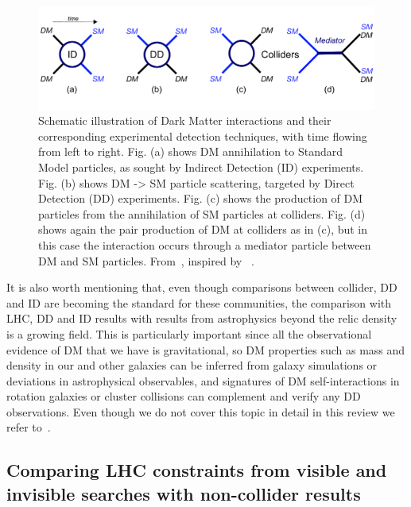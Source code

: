 \begin{figure}[!htpb]
\includegraphics[width=\textwidth]{figures/EFTSimplifiedModels}
\caption{Schematic illustration of Dark Matter interactions and their corresponding experimental detection techniques, with time flowing from left to right. Fig. (a) shows DM annihilation to Standard Model particles, as sought by Indirect Detection (ID) experiments. Fig. (b) shows DM -> SM particle scattering, targeted by Direct Detection (DD) experiments. Fig. (c) shows the production of DM particles from the annihilation of SM particles at colliders. Fig. (d) shows again the pair production of DM at colliders as in (c), but in this case the interaction occurs through a mediator particle between DM and SM particles. From~\cite{monoXfig}, inspired by ~\cite{Bauer:2013ihz}.}
\label{fig:Complementarity}
\end{figure}

It is also worth mentioning that, even though comparisons between collider, DD and ID are becoming the standard for these communities,
the comparison with LHC, DD and ID results with results from astrophysics beyond the relic density is a growing field. 
This is particularly important since all the observational evidence of DM that we have is gravitational,
so DM properties such as mass and density in our and other galaxies
can be inferred from galaxy simulations or deviations in astrophysical observables, 
and signatures of DM self-interactions in rotation galaxies or cluster collisions can complement and verify any DD 
observations. Even though we do not cover this topic in detail in this review we refer to~\cite{Buckley:2017ijx}. 

\subsection{Comparing LHC constraints from visible and invisible searches with non-collider results}

